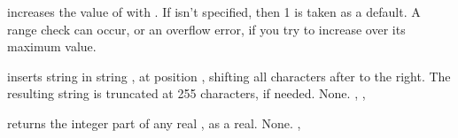 \documentclass{report}
\begin{document}


{ increases the value of  with .
If  isn't specified, then 1 is taken as a default.}
{A range check can occur, or an overflow error, if you try to increase 
over its maximum value.}
{}



{ inserts string  in string , at position
, shifting all characters after  to the right. The
resulting string is truncated at 255 characters, if needed.}
{None.}
{, , }



{ returns the integer part of any real , as a real.}
{None.}
{, }


\end{document}
